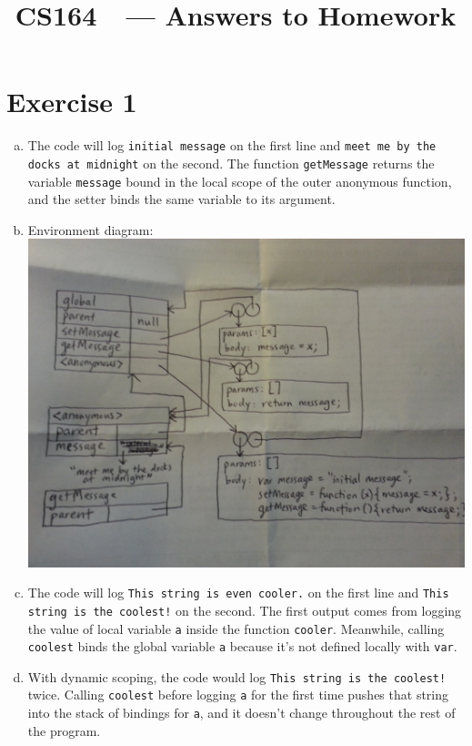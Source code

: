 \documentclass[11pt]{article}
\title{CS164\ \Session\  --- Answers to Homework \Homework}
\author{\Name}
\begin{document}
\maketitle
{}
\setcounter{problemnumber}{0}

\section*{Exercise 1}
\begin{enumerate}[(a)]
\item The code will log \texttt{initial message} on the first line and \texttt{meet me by the docks at midnight} on the second. The function \texttt{getMessage} returns the variable \texttt{message} bound in the local scope of the outer anonymous function, and the setter binds the same variable to its argument.
\item Environment diagram:\\
\includegraphics[scale=0.125]{env}
\item The code will log \texttt{This string is even cooler.} on the first line and \texttt{This string is the coolest!} on the second. The first output comes from logging the value of local variable \texttt{a} inside the function \texttt{cooler}. Meanwhile, calling \texttt{coolest} binds the global variable \texttt{a} because it's not defined locally with \texttt{var}.
\item With dynamic scoping, the code would log \texttt{This string is the coolest!} twice. Calling \texttt{coolest} before logging \texttt{a} for the first time pushes that string into the stack of bindings for \texttt{a}, and it doesn't change throughout the rest of the program.
\end{enumerate}
\end{document}
